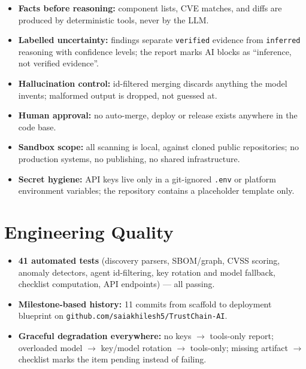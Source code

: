 \documentclass[11pt,a4paper]{article}
\begin{document}
\begin{itemize}[itemsep=2pt]
  \item \textbf{Facts before reasoning:} component lists, CVE matches, and diffs are
        produced by deterministic tools, never by the LLM.
  \item \textbf{Labelled uncertainty:} findings separate \texttt{verified} evidence
        from \texttt{inferred} reasoning with confidence levels; the report marks AI
        blocks as ``inference, not verified evidence''.
  \item \textbf{Hallucination control:} id-filtered merging discards anything the model
        invents; malformed output is dropped, not guessed at.
  \item \textbf{Human approval:} no auto-merge, deploy or release exists anywhere in
        the code base.
  \item \textbf{Sandbox scope:} all scanning is local, against cloned public
        repositories; no production systems, no publishing, no shared infrastructure.
  \item \textbf{Secret hygiene:} API keys live only in a git-ignored \texttt{.env} or
        platform environment variables; the repository contains a placeholder template
        only.
\end{itemize}

\section{Engineering Quality}

\begin{itemize}[itemsep=2pt]
  \item \textbf{41 automated tests} (discovery parsers, SBOM/graph, CVSS scoring,
        anomaly detectors, agent id-filtering, key rotation and model fallback,
        checklist computation, API endpoints) --- all passing.
  \item \textbf{Milestone-based history:} 11 commits from scaffold to deployment
        blueprint on \texttt{github.com/saiakhilesh5/TrustChain-AI}.
  \item \textbf{Graceful degradation everywhere:} no keys $\rightarrow$ tools-only
        report; overloaded model $\rightarrow$ key/model rotation $\rightarrow$
        tools-only; missing artifact $\rightarrow$ checklist marks the item pending
        instead of failing.
\end{itemize}
\end{document}
